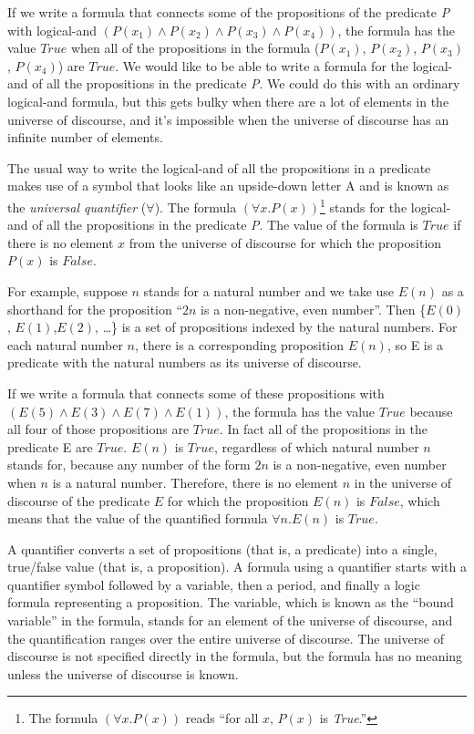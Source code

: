 {{If we write a formula that connects some of the propositions
of the predicate \emph{P} with logical-and
$(P(x_1) \wedge P(x_2) \wedge P(x_3) \wedge P(x_4))$,
the formula has the value $True$
when all of the propositions in the formula ($P(x_1)$, $P(x_2)$, $P(x_3)$, $P(x_4)$)
are $True$.
We would like to be able to write a formula
for the logical-and of all the propositions in the predicate \emph{P}.
We could do this with an ordinary logical-and formula,
but this gets bulky when there are a lot of elements
in the universe of discourse,
and it's impossible when the universe of discourse
has an infinite number of elements.

The usual way to write the logical-and of all the propositions in a predicate
makes use of a symbol that looks like an upside-down letter A
and is known as the
\label{def:universal-quantifier}\emph{universal quantifier} ($\forall$).
The  formula $(\forall x.P(x))$\footnote{The
formula $(\forall x. P(x))$ reads ``for all $x$, $P(x)$ is \emph{True}.''}
stands for the logical-and of all the propositions in the predicate \emph{P}.
The value of the formula is $True$
if there is no element $x$ from the universe of discourse
for which the proposition $P(x)$ is $False$.

For example, suppose $n$ stands for a natural number
and we take use
$E(n)$ as a shorthand for the proposition ``$2n$ is a non-negative, even number''.
Then \{$E(0)$, $E(1)$,$E(2)$, \dots\}
is a set of propositions indexed by the natural numbers.
For each natural number $n$, there is a corresponding proposition $E(n)$,
so E is a predicate with the natural numbers
as its universe of discourse.

If we write a formula that connects some of these propositions with
$(E(5) \wedge E(3) \wedge E(7) \wedge E(1))$,
the formula has the value $True$
because all four of those propositions are $True$.
In fact all of the propositions in the predicate E are $True$.
$E(n)$ is $True$, regardless of which natural number $n$ stands for,
because any number of the form $2n$ is a non-negative, even number
when $n$ is a natural number.
Therefore, there is no element $n$ in the universe of discourse of
the predicate $E$ for which the proposition $E(n)$ is $False$,
which means that the value of the quantified formula $\forall n.E(n)$
is $True$.

A
\label{def:quantifier}
quantifier converts a set of propositions (that is, a predicate)
into a single, true/false value (that is, a proposition).
A formula using a quantifier starts with a quantifier symbol followed by
a variable, then a period, and finally a logic formula
representing a proposition. The variable,
which is known as the
\label{def:bound-variable}
``bound variable''
in the formula, stands for an
element of the universe of discourse, and the quantification
ranges over the entire universe of discourse.
The universe of discourse is not specified directly
in the formula, but the formula has no meaning unless
the universe of discourse is known.

}}
